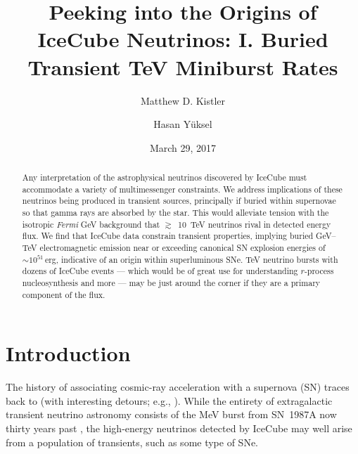 \documentclass[aps,prd,nofootinbib,twocolumn,floatfix,letterpaper,superscriptaddress,showpacs]{revtex4}
\begin{document}
\title{Peeking into the Origins of IceCube Neutrinos: I. Buried Transient TeV Miniburst Rates}

\author{Matthew D. Kistler}

\author{Hasan Y{\"u}ksel}
%

\date{March 29, 2017}

\begin{abstract}
%
Any interpretation of the astrophysical neutrinos discovered by IceCube must accommodate a variety of multimessenger constraints.  We address implications of these neutrinos being produced in transient sources, principally if buried within supernovae so that gamma rays are absorbed by the star.   This would alleviate tension with the isotropic {\it Fermi} GeV background that $\gtrsim$~10~TeV neutrinos rival in detected energy flux.
We find that IceCube data constrain transient properties, implying buried GeV--TeV electromagnetic emission near or exceeding canonical SN explosion energies of $\sim\!10^{51}\,$erg, indicative of an origin within superluminous SNe.  TeV neutrino bursts with dozens of IceCube events --- which would be of great use for understanding $r$-process nucleosynthesis and more --- may be just around the corner if they are a primary component of the flux.
%
\end{abstract}

\maketitle


\section{Introduction}
%
The history of associating cosmic-ray acceleration with a supernova (SN) traces back to \citet{Baade} (with interesting detours; e.g., \cite{Burbidge1958,Hoyle1960}).  While the entirety of extragalactic transient neutrino astronomy consists of the MeV burst from SN~1987A now thirty years past \cite{Hirata:1987hu,Hirata:1988ad,Bionta:1987qt,Bratton:1988ww}, the high-energy neutrinos detected by IceCube
\cite{Aartsen2013,Aartsen2013b,Aartsen2014,Kopper2015,Aartsen2015,Niederhausen2015,Aartsen2015b,Aartsen:2016xlq} may well arise from a population of transients, such as some type of SNe.
\end{document}

